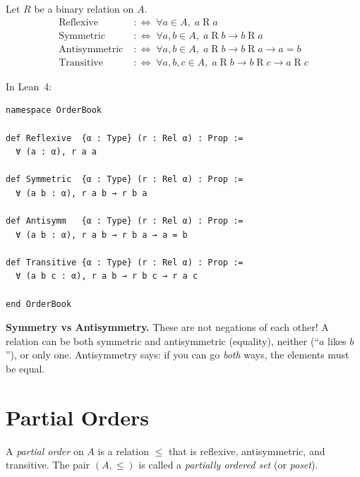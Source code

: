 \documentclass[12pt, a4paper, openright]{book}
\theoremstyle{thmstyle}
\theoremstyle{defstyle}
\newenvironment{defbox}[1][]{%
  \begin{tcolorbox}[defbox, title={Definition\ifx\\#1\\\else\ --- #1\fi}]%
}{\end{tcolorbox}}
\newenvironment{notebox}{%
  \begin{tcolorbox}[notebox]%
}{\end{tcolorbox}}
\begin{document}
\begin{defbox}[Reflexivity, Symmetry, Antisymmetry, Transitivity]
  Let $R$ be a binary relation on $A$.
  \begin{align*}
    \text{Reflexive}    &\;:\iff\; \forall a \in A,\; a \mathrel{R} a \\
    \text{Symmetric}    &\;:\iff\; \forall a, b \in A,\; a \mathrel{R} b \to b \mathrel{R} a \\
    \text{Antisymmetric}&\;:\iff\; \forall a, b \in A,\; a \mathrel{R} b \to b \mathrel{R} a \to a = b \\
    \text{Transitive}   &\;:\iff\; \forall a, b, c \in A,\; a \mathrel{R} b \to b \mathrel{R} c \to a \mathrel{R} c
  \end{align*}
\end{defbox}

In Lean~4:

\begin{verbatim}
namespace OrderBook

def Reflexive  {α : Type} (r : Rel α) : Prop :=
  ∀ (a : α), r a a

def Symmetric  {α : Type} (r : Rel α) : Prop :=
  ∀ (a b : α), r a b → r b a

def Antisymm   {α : Type} (r : Rel α) : Prop :=
  ∀ (a b : α), r a b → r b a → a = b

def Transitive {α : Type} (r : Rel α) : Prop :=
  ∀ (a b c : α), r a b → r b c → r a c

end OrderBook
\end{verbatim}

\begin{notebox}
  \textbf{Symmetry vs Antisymmetry.}
  These are not negations of each other! A relation can be both symmetric and
  antisymmetric (equality), neither (``$a$ likes $b$''), or only one.
  Antisymmetry says: if you can go \emph{both} ways, the elements must be equal.
\end{notebox}

\section{Partial Orders}

\begin{defbox}[Partial Order]
  A \emph{partial order} on $A$ is a relation $\leq$ that is
  reflexive, antisymmetric, and transitive.
  The pair $(A, \leq)$ is called a \emph{partially ordered set} (or
  \emph{poset}).
\end{defbox}
\end{document}
